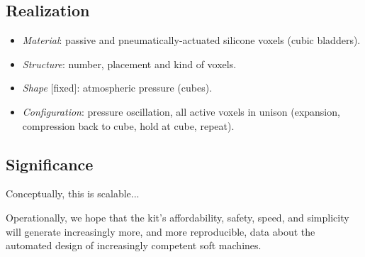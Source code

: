 \subsection{Realization}

\begin{itemize}
    \item \textit{Material}: passive and pneumatically-actuated silicone voxels (cubic bladders).
    \item \textit{Structure}: number, placement and kind of voxels.
    \item \textit{Shape} [fixed]: atmospheric pressure (cubes).
    \item \textit{Configuration}: pressure oscillation, all active voxels in unison (expansion, compression back to cube, hold at cube, repeat).
\end{itemize}


\subsection{Significance}


Conceptually,
this is scalable...

Operationally,
we hope that the kit's affordability, safety, speed, and simplicity will generate increasingly more, and more reproducible, data about the automated design of increasingly competent soft machines.





